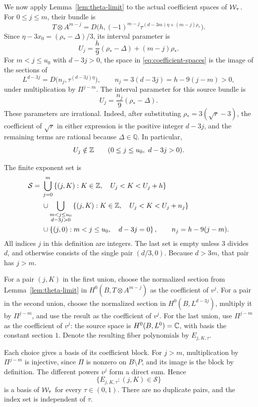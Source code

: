 We now apply Lemma~\ref{lem:theta-limit} to the actual coefficient
spaces of $\mathcal W_\tau$. For $0\leq j\leq m$, their bundle is
\[
 T\otimes A^{m-j}
  =D\bigl(h,(-1)^{m-j}
      \tau^{(d-3m)\eta+(m-j)\rho_*}\bigr).
\]
Since $\eta-3x_0=(\rho_*-\Delta)/3$, its interval parameter is
\[
 U_j=\frac h9(\rho_*-\Delta)+(m-j)\rho_*.
\]
For $m<j\leq u_0$ with $d-3j>0$, the space in
\eqref{eq:coefficient-spaces} is the image of the sections of
\[
 L^{d-3j}=D\bigl(n_j,\tau^{(d-3j)\eta}\bigr),
 \qquad n_j=3(d-3j)=h-9(j-m)>0,
\]
under multiplication by $\Pi^{j-m}$. The interval parameter for
this source bundle is
\[
 U_j=\frac{n_j}{9}(\rho_*-\Delta).
\]
These parameters are irrational. Indeed, after substituting
$\rho_*=3(\sqrt r-3)$, the coefficient of $\sqrt r$ in either
expression is the positive integer $d-3j$, and the remaining
terms are rational because $\Delta\in\mathbb Q$. In particular,
\begin{equation}
 U_j\notin\mathbb Z\qquad
 (0\leq j\leq u_0,\ d-3j>0).
 \label{eq:nonintegral}
\end{equation}

The finite exponent set is
\begin{equation}
\begin{split}
 \mathcal S={}&
  \bigcup_{j=0}^{m}
    \left\{(j,K):K\in\mathbb Z,\quad
        U_j<K<U_j+h\right\}
 \\
 &{}\cup
  \bigcup_{\substack{m<j\leq u_0\\d-3j>0}}
    \left\{(j,K):K\in\mathbb Z,\quad
        U_j<K<U_j+n_j\right\}
 \\
 &{}\cup
  \left\{(j,0):m<j\leq u_0,\quad d-3j=0\right\},
 \qquad n_j=h-9(j-m).
\end{split}
\label{eq:exponent-set}
\end{equation}
All indices $j$ in this definition are integers. The last set is
empty unless $3$ divides $d$, and otherwise consists of the single
pair $(d/3,0)$. Because $d>3m$, that pair has $j>m$.

For a pair $(j,K)$ in the first union, choose the normalized
section from Lemma~\ref{lem:theta-limit} in
$H^0(B,T\otimes A^{m-j})$ as the coefficient of $v^j$.
For a pair in the second union, choose the normalized section in
$H^0(B,L^{d-3j})$, multiply it by $\Pi^{j-m}$, and use the result
as the coefficient of $v^j$. For the last union, use
$\Pi^{j-m}$ as the coefficient of $v^j$: the source space is
$H^0(B,L^0)=\mathbb C$, with basis the constant section $1$.
Denote the resulting fiber polynomials by $E_{j,K,\tau}$.

Each choice gives a basis of its coefficient block. For $j>m$,
multiplication by $\Pi^{j-m}$ is injective, since $\Pi$ is nonzero
on $B\setminus P$, and its image is the block by definition.
The different powers $v^j$ form a direct sum. Hence
\[
 \{E_{j,K,\tau}:(j,K)\in\mathcal S\}
\]
is a basis of $\mathcal W_\tau$ for every $\tau\in(0,1)$. There are no
duplicate pairs, and the index set is independent of $\tau$.

